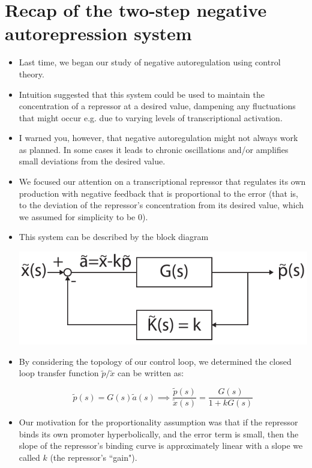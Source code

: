 \documentclass{article}
\begin{document}
\large

\section*{Recap of the two-step negative autorepression system}

\begin{itemize}
\item Last time, we began our study of negative autoregulation using control theory.
\item Intuition suggested that this system could be used to maintain the concentration of a repressor at a desired value, dampening any fluctuations that might occur e.g. due to varying levels of transcriptional activation.
\item I warned you, however, that negative autoregulation might not always work as planned. In some cases it leads to chronic oscillations and/or amplifies small deviations from the desired value.
\item We focused our attention on a transcriptional repressor that regulates its own production with negative feedback that is proportional to the error (that is, to the deviation of the repressor's concentration from its desired value, which we assumed for simplicity to be 0).
\item This system can be described by the block diagram
\begin{center}\includegraphics[width=0.5 \textwidth]{autorepression_twostep.pdf}\end{center}

\item By considering the topology of our control loop, we determined the closed loop transfer function $\tilde{p}/\tilde{x}$ can be written as:

\[ \tilde{p}(s) = G(s) \tilde{a}(s) \implies \frac{\tilde{p}(s)}{\tilde{x}(s)} = \frac{G(s)}{1 + kG(s)} \]


\item Our motivation for the proportionality assumption was that if the repressor binds its own promoter hyperbolically, and the error term is small, then the slope of the repressor's binding curve is approximately linear with a slope we called $k$ (the repressor's ``gain").


\end{itemize}
\end{document}
